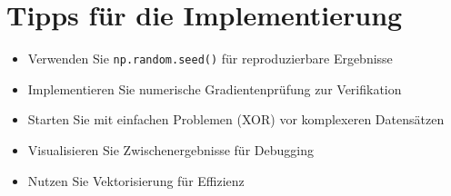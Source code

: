 ﻿\documentclass[12pt,a4paper]{article}
\begin{document}
\section*{Tipps für die Implementierung}
\begin{itemize}
    \item Verwenden Sie \texttt{np.random.seed()} für reproduzierbare Ergebnisse
    \item Implementieren Sie numerische Gradientenprüfung zur Verifikation
    \item Starten Sie mit einfachen Problemen (XOR) vor komplexeren Datensätzen
    \item Visualisieren Sie Zwischenergebnisse für Debugging
    \item Nutzen Sie Vektorisierung für Effizienz
\end{itemize}
\end{document}
